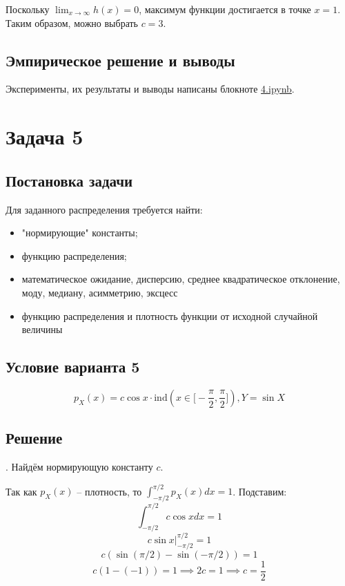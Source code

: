 \documentclass[a4paper,14pt]{extarticle}
\begin{document}
                    Поскольку $\lim_{x \to \infty} h(x) = 0$, максимум функции достигается в точке $x=1$.
                    Таким образом, можно выбрать $c = 3$.
        
        \subsection*{Эмпирическое решение и выводы}
            Эксперименты, их результаты и выводы написаны блокноте \href{https://github.com/vorandpav/TVIPS}{4.ipynb}.
            
    
    
    \section*{Задача 5}
        
        \subsection*{Постановка задачи}
            
            Для заданного распределения требуется найти:
            \begin{itemize}
                \item "нормирующие" константы;
                \item функцию распределения;
                \item математическое ожидание, дисперсию, среднее квадратическое отклонение, моду, медиану, асимметрию, эксцесс
                \item функцию распределения и плотность функции от исходной случайной величины
            \end{itemize}
        
        \subsection*{Условие варианта 5}
            \[p_X(x) = c \cos x \cdot \mathrm{ind}(x \in \big[-\frac{\pi}{2}, \frac{\pi}{2}\big]), Y = \sin X\]
        
        \subsection*{Решение}
            . Найдём нормирующую константу $c$.
            
            Так как $p_X(x)$ -- плотность, то $\int_{-\pi/2}^{\pi/2} p_X(x) dx = 1$. Подставим:
            \[\int_{-\pi/2}^{\pi/2} c \cos x dx = 1\]
            \[c \sin x |^{\pi/2}_{-\pi/2} = 1\]
            \[c(\sin(\pi/2) - \sin(-\pi/2)) = 1\]
            \[c(1 - (-1)) = 1 \implies 2c = 1 \implies \boxed{c = \frac{1}{2}}\]
            
\end{document}
